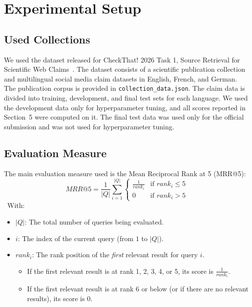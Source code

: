 \section{Experimental Setup}
\label{sec:setup}

\subsection{Used Collections}
We used the dataset released for CheckThat! 2026 Task 1, Source Retrieval for Scientific Web Claims~\cite{ct26task1dataset}. The dataset consists of a scientific publication collection and multilingual social media claim datasets in English, French, and German.
The publication corpus is provided in \texttt{collection\_data.json}. The claim data is divided into training, development, and final test sets for each language. We used the development data only for hyperparameter tuning, and all scores reported in Section~5 were computed on it. The final test data was used only for the official submission and was not used for hyperparameter tuning.

\subsection{Evaluation Measure}
The main evaluation measure used is the Mean Reciprocal Rank at 5 (MRR@5):
$$MRR@5 = \frac{1}{|Q|} \sum_{i=1}^{|Q|} \begin{cases} \frac{1}{rank_i} & \text{if } rank_i \le 5 \\ 0 & \text{if } rank_i > 5 \end{cases}$$
\
With:
\begin{itemize}
    \item \textbf{$|Q|$}: The total number of queries being evaluated.
    \item \textbf{$i$}: The index of the current query (from $1$ to $|Q|$).
    \item \textbf{$rank_i$}: The rank position of the \textit{first} relevant result for query $i$.
    \begin{itemize}
        \item If the first relevant result is at rank 1, 2, 3, 4, or 5, its score is $\frac{1}{rank_i}$.
        \item If the first relevant result is at rank 6 or below (or if there are no relevant results), its score is $0$.
    \end{itemize}
\end{itemize}

